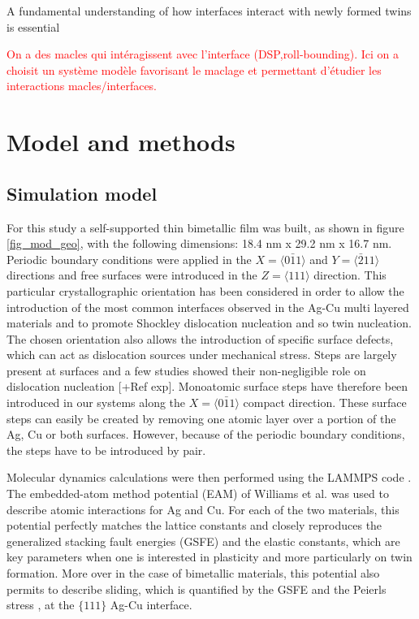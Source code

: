 \documentclass[final,3p,times,twocolumn]{elsarticle}
\begin{document}
A fundamental understanding of how interfaces interact with newly formed twins is essential

\textcolor{red}{On a des macles qui intéragissent avec l'interface (DSP,roll-bounding). Ici on a choisit un système modèle favorisant le maclage et permettant d'étudier les interactions macles/interfaces.}

\section{Model and methods}
\label{part_methods}

	\subsection{Simulation model}
	\label{subpart_model}
	
For this study a self-supported thin bimetallic film was built, as shown in figure \ref{fig_mod_geo}, with the following dimensions: 18.4 nm x 29.2 nm x 16.7 nm. Periodic boundary conditions were applied in the $X=\langle0\bar{1}1\rangle$ and $Y=\langle\bar{2}11\rangle$ directions and free surfaces were introduced in the $Z=\langle111\rangle$ direction. This particular crystallographic orientation has been considered in order to allow the introduction of the most common interfaces observed in the Ag-Cu multi layered materials and to promote Shockley dislocation nucleation and so twin nucleation. The chosen orientation also allows the introduction of specific surface defects, which can act as dislocation sources under mechanical stress. Steps are largely present at surfaces and a few studies showed their non-negligible role on dislocation nucleation \cite{brochard00PMA,hirel07SM} [+Ref exp]. Monoatomic surface steps have therefore been introduced in our systems along the $X=\langle0\bar{1}1\rangle$ compact direction. These surface steps can easily be created by removing one atomic layer over a portion of the Ag, Cu or both surfaces. However, because of the periodic boundary conditions, the steps have to be introduced by pair. 

Molecular dynamics calculations were then performed using the LAMMPS code \cite{plimpton95JCP}. The  embedded-atom method potential (EAM) of Williams et al. \cite{williams06MSMSE} was used to describe atomic interactions for Ag and Cu. For each of the two materials, this potential perfectly matches the lattice constants and closely reproduces the generalized stacking fault energies (GSFE) and the elastic constants, which are key parameters when one is interested in plasticity and more particularly on twin formation. More over in the case of bimetallic materials, this potential also permits to describe sliding, which is quantified by the GSFE and the Peierls stress \cite{li15PM}, at the $\lbrace111\rbrace$ Ag-Cu interface.
\end{document}

